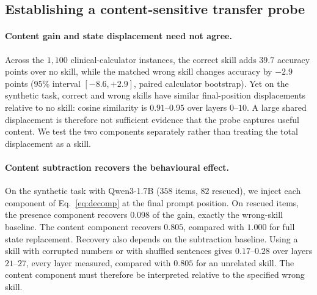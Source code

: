 \subsection{Establishing a content-sensitive transfer probe}
\label{sec:decomp}

\paragraph{Content gain and state displacement need not agree.}
Across the $1{,}100$ clinical-calculator instances, the correct skill adds
$39.7$ accuracy points over no skill, while the matched wrong skill changes
accuracy by $-2.9$ points ($95\%$ interval $[-8.6,+2.9]$, paired calculator
bootstrap). Yet on the synthetic task, correct and wrong skills have similar
final-position displacements relative to no skill: cosine similarity is
$0.91$--$0.95$ over layers $0$--$10$. A large shared displacement is therefore
not sufficient evidence that the probe captures useful content. We test the
two components separately rather than treating the total displacement as a skill.

\paragraph{Content subtraction recovers the behavioural effect.}
On the synthetic task with Qwen3-1.7B ($358$ items, $82$ rescued), we inject
each component of Eq.~\ref{eq:decomp} at the final prompt position. On rescued
items, the presence component recovers $0.098$ of the gain, exactly the
wrong-skill baseline. The content component recovers $0.805$, compared with
$1.000$ for full state replacement. Recovery also depends on the
subtraction baseline. Using a skill with corrupted numbers or with shuffled sentences gives
$0.17$--$0.28$ over layers $21$--$27$, every layer measured, compared with
$0.805$ for an unrelated skill. The content component must therefore be
interpreted relative to the specified wrong skill.

